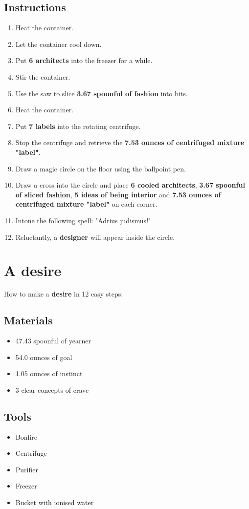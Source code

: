 \documentclass{article}
\begin{document}
\subsection{Instructions}\begin{enumerate}
\item 
Heat the container.
\item 
Let the container cool down.
\item 
Put \textbf{6 architects} into the freezer for a while.
\item 
Stir the container.
\item 
Use the saw to slice \textbf{3.67 spoonful of fashion} into bits.
\item 
Heat the container.
\item 
Put \textbf{7 labels} into the rotating centrifuge.
\item 
Stop the centrifuge and retrieve the \textbf{7.53 ounces of centrifuged mixture "label"}.
\item 
Draw a magic circle on the floor using the ballpoint pen.
\item 
Draw a cross into the circle and place \textbf{6 cooled architects}, \textbf{3.67 spoonful of sliced fashion}, \textbf{5 ideas of being interior} and \textbf{7.53 ounces of centrifuged mixture "label"} on each corner.
\item 
Intone the following spell: "Adrius judismus!"
\item 
Reluctantly, a \textbf{designer} will appear inside the circle.
\end{enumerate}
\newpage
\section{A desire}How to make a \textbf{desire} in 12 easy steps:

\subsection{Materials}\begin{itemize}
\item 
47.43 spoonful of yearner
\item 
54.0 ounces of goal
\item 
1.05 ounces of instinct
\item 
3 clear concepts of crave
\end{itemize}
\subsection{Tools}\begin{itemize}
\item 
Bonfire
\item 
Centrifuge
\item 
Purifier
\item 
Freezer
\item 
Bucket with ionised water
\end{itemize}
\end{document}
